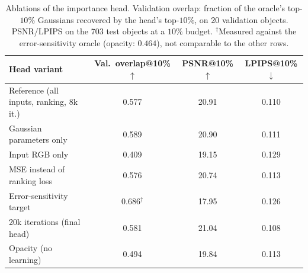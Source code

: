 \begin{table}[t]
\centering
\small
\setlength{\tabcolsep}{4pt}
\begin{tabular}{lccc}
\toprule
Head variant & Val.\ overlap@10\%$\uparrow$ & PSNR@10\%$\uparrow$ & LPIPS@10\%$\downarrow$ \\
\midrule
Reference (all inputs, ranking, 8k it.) & 0.577 & 20.91 & 0.110 \\
\quad Gaussian parameters only & 0.589 & 20.90 & 0.111 \\
\quad Input RGB only & 0.409 & 19.15 & 0.129 \\
\quad MSE instead of ranking loss & 0.576 & 20.74 & 0.113 \\
\quad Error-sensitivity target & 0.686$^\dagger$ & 17.95 & 0.126 \\
\quad 20k iterations (final head) & 0.581 & 21.04 & 0.108 \\
\midrule
Opacity (no learning) & 0.494 & 19.84 & 0.113 \\
\bottomrule
\end{tabular}
\caption{Ablations of the importance head. Validation overlap: fraction of the oracle's top-$10\%$ Gaussians recovered by the head's top-$10\%$, on 20 validation objects. PSNR/LPIPS on the 703 test objects at a $10\%$ budget. $^\dagger$Measured against the error-sensitivity oracle (opacity: $0.464$), not comparable to the other rows.}
\label{tab:ablation}
\end{table}
